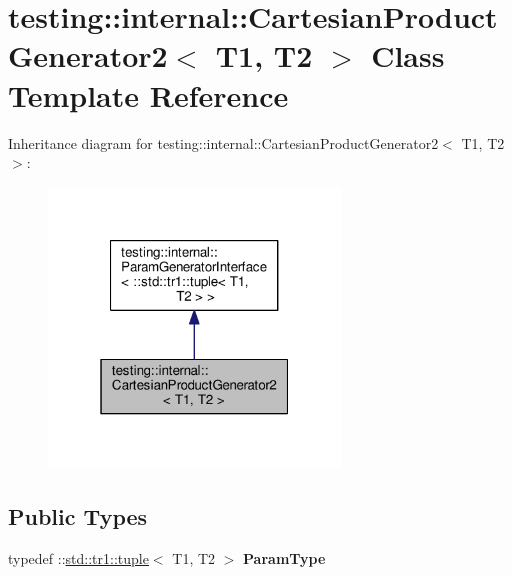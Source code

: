 \hypertarget{classtesting_1_1internal_1_1_cartesian_product_generator2}{}\section{testing\+:\+:internal\+:\+:Cartesian\+Product\+Generator2$<$ T1, T2 $>$ Class Template Reference}
\label{classtesting_1_1internal_1_1_cartesian_product_generator2}


Inheritance diagram for testing\+:\+:internal\+:\+:Cartesian\+Product\+Generator2$<$ T1, T2 $>$\+:
\nopagebreak
\begin{figure}[H]
\begin{center}
\leavevmode
\includegraphics[width=220pt]{classtesting_1_1internal_1_1_cartesian_product_generator2__inherit__graph}
\end{center}
\end{figure}
\subsection*{Public Types}
\begin{DoxyCompactItemize}
\item 
\mbox{\label{classtesting_1_1internal_1_1_cartesian_product_generator2_a036b6f14a61a69fac5d21dd7ff5b8913}} 
typedef \+::\mbox{\hyperlink{classstd_1_1tr1_1_1tuple}{std\+::tr1\+::tuple}}$<$ T1, T2 $>$ {\bfseries Param\+Type}
\end{DoxyCompactItemize}
